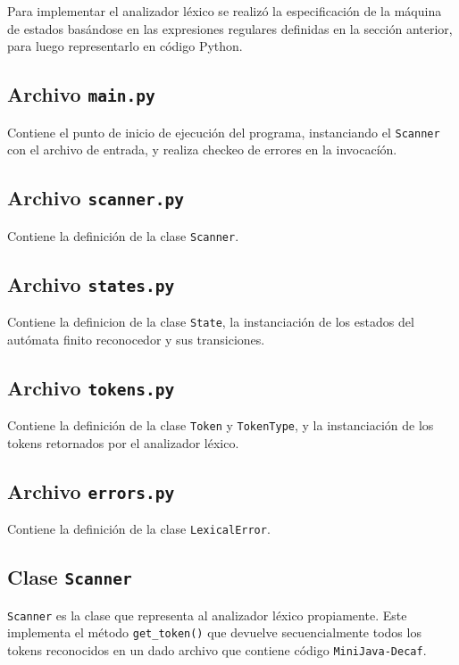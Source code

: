 \documentclass [a4paper,titlepage]{report}
\begin{document}
Para implementar el analizador léxico se realizó la especificación de
la máquina  de estados basándose en las expresiones regulares
definidas en la sección  anterior, para luego representarlo en código
Python.

\subsection{Archivo \texttt{main.py}}

Contiene el punto de inicio de ejecución del programa, instanciando
el \texttt{Scanner} con el archivo de entrada, y realiza checkeo de
errores en la invocacíón.

\subsection{Archivo \texttt{scanner.py}}

Contiene la definición de la clase \texttt{Scanner}. 

\subsection{Archivo \texttt{states.py}}

Contiene la definicion de la clase \texttt{State}, la instanciación de
los estados del autómata finito reconocedor y sus transiciones.

\subsection{Archivo \texttt{tokens.py}}

Contiene la definición de la clase \texttt{Token} y
\texttt{TokenType}, y la  instanciación de los tokens retornados por
el analizador léxico.

\subsection{Archivo \texttt{errors.py}}

Contiene la definición de la clase \texttt{LexicalError}.

\subsection{Clase \texttt{Scanner}}

\texttt{Scanner} es la clase que representa al analizador léxico propiamente.
Este implementa el método \texttt{get\_token()} que devuelve
secuencialmente todos los tokens reconocidos en un dado archivo que
contiene código \texttt{MiniJava-Decaf}. 
\end{document}
